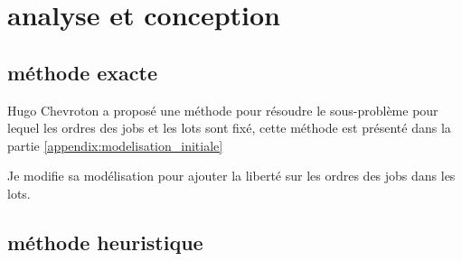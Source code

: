 \chapter{analyse et conception}


\section{méthode exacte}
Hugo Chevroton a proposé une méthode pour résoudre le sous-problème pour lequel les ordres des jobs et les lots sont fixé,
cette méthode est présenté dans la partie \autoref{appendix:modelisation_initiale}

Je modifie sa modélisation pour ajouter la liberté sur les ordres des jobs dans les lots.



\section{méthode heuristique}